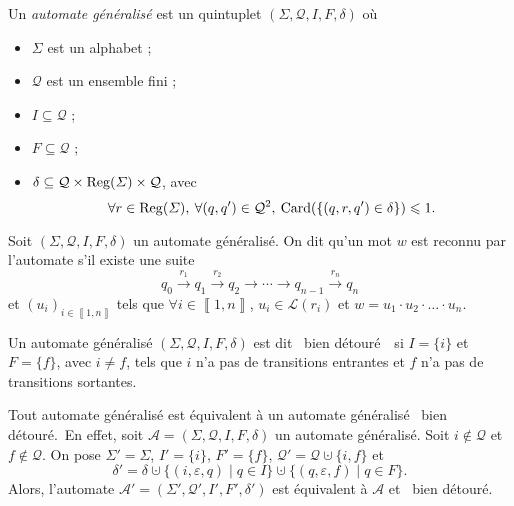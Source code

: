\begin{defn}
	Un \textit{automate généralisé} est un quintuplet $(\Sigma, \mathcal{Q}, I, F, \delta)$\/ où
	\begin{itemize}
		\item $\Sigma$\/ est un alphabet ;
		\item $\mathcal{Q}$\/ est un ensemble fini ;
		\item $I \subseteq  \mathcal{Q}$\/ ;
		\item $F \subseteq \mathcal{Q}$\/ ;
		\item $\delta \subseteq \mathcal{Q} \times \operatorname{Reg}(\varSigma) \times \mathcal{Q}$, avec \[
			\forall r \in \operatorname{Reg}(\varSigma),\:\forall (q,q') \in \mathcal{Q}^2,\:\operatorname{Card}(\{(q,r,q') \in \delta\}) \leqslant 1
		.\]
	\end{itemize}
\end{defn}

\begin{defn}
	Soit $(\Sigma, \mathcal{Q}, I, F, \delta)$\/ un automate généralisé.
	On dit qu'un mot $w$\/ est reconnu par l'automate s'il existe une suite \[
		q_0 \xrightarrow{r_1} q_1 \xrightarrow{r_2} q_2 \to \cdots \to q_{n-1}\xrightarrow{r_n} q_n
	\] et $(u_i)_{i \in \left\llbracket 1,n \right\rrbracket}$\/ tels que $\forall i \in \left\llbracket 1,n \right\rrbracket$, $u_i \in \mathcal{L}(r_i)$\/ et $w = u_1 \cdot u_2 \cdot \ldots \cdot u_n$.
\end{defn}

\begin{defn}
	Un automate généralisé $(\Sigma, \mathcal{Q}, I, F, \delta)$\/ est dit \guillemotleft~bien détouré\footnotemark~\guillemotright\ si $I = \{i\}$ et $F = \{f\}$, avec $i \neq f$, tels que $i$\/ n'a pas de transitions entrantes et $f$\/ n'a pas de transitions sortantes.
\end{defn}

\begin{lem}
	Tout automate généralisé est équivalent à un automate généralisé \guillemotleft~bien détouré.~\guillemotright\@ En effet, soit $\mathcal{A} = (\Sigma, \mathcal{Q}, I, F, \delta)$\/ un automate généralisé.
	Soit $i \not\in \mathcal{Q}$\/ et $f \not\in \mathcal{Q}$.
	On pose $\Sigma' = \Sigma$, $I' = \{i\}$, $F' = \{f\}$, $\mathcal{Q}' = \mathcal{Q} \cupdot \{i,f\}$\/ et \[
		\delta' = \delta \cupdot \{(i,\varepsilon,q)  \mid q \in I\} \cupdot \{(q,\varepsilon,f)  \mid q \in F\}
	.\] Alors, l'automate $\mathcal{A}' = (\Sigma', \mathcal{Q}', I', F', \delta')$\/ est équivalent à $\mathcal{A}$\/ et \guillemotleft~bien détouré.~\guillemotright
\end{lem}

